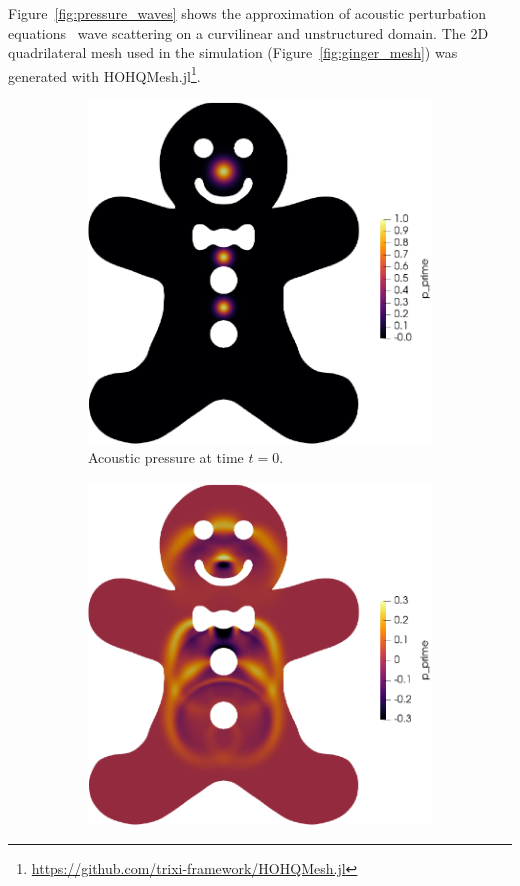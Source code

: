 \documentclass[hidelinks]{juliacon} %
\begin{document}
Figure~\ref{fig:pressure_waves} shows the approximation
of acoustic perturbation equations~\cite{ewert2003acoustic} wave scattering on a
curvilinear and unstructured domain. The 2D quadrilateral mesh used in the simulation
(Figure~\ref{fig:ginger_mesh}) was generated with
HOHQMesh.jl\xspace\footnote{\url{https://github.com/trixi-framework/HOHQMesh.jl}}.
\begin{figure}[!h]
\vspace{-0.7em}
  \begin{subfigure}{0.46\linewidth}
    \includegraphics[width=\textwidth]{../figures/ginger_time_00}
    \caption{Acoustic pressure at time $t = 0$.}
  \end{subfigure}%
  \hspace*{\fill}
  \begin{subfigure}{0.46\linewidth}
    \includegraphics[width=\textwidth]{../figures/ginger_time_08}

\end{subfigure}
\end{figure}
\end{document}

